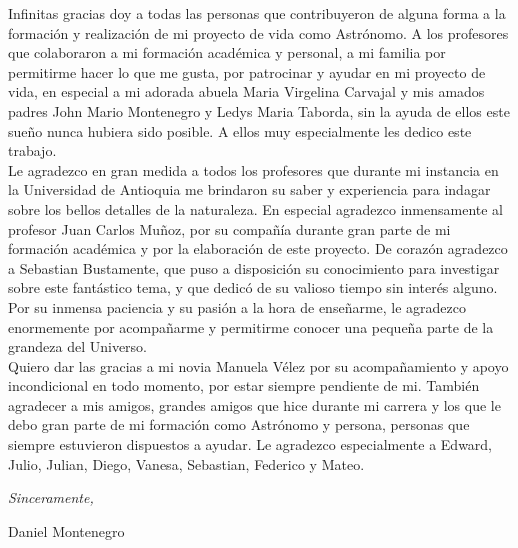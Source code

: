 \begin{acknowledgements}      

Infinitas gracias doy a todas las personas que contribuyeron de alguna forma a la formación y realización de mi proyecto de vida como Astrónomo. A los profesores que colaboraron a mi formación académica y personal, a mi familia por permitirme hacer lo que me gusta, por patrocinar y ayudar en mi proyecto de vida, en especial a mi adorada abuela Maria Virgelina Carvajal y mis amados padres  John Mario Montenegro y Ledys Maria Taborda, sin la ayuda de ellos este sueño nunca hubiera sido posible. A ellos muy especialmente les dedico este trabajo. \\

Le agradezco en gran medida a todos los profesores que durante mi instancia en la Universidad de Antioquia me brindaron su saber y experiencia para indagar sobre los bellos detalles de la naturaleza. En especial agradezco inmensamente al profesor Juan Carlos Mu\~noz, por su compañía durante gran parte de mi formación académica y por la elaboración de este proyecto. De corazón agradezco a Sebastian Bustamente, que puso a disposición su conocimiento para investigar sobre este fantástico tema, y que dedicó de su valioso tiempo sin interés alguno. Por su inmensa paciencia y su pasión a la hora de enseñarme, le agradezco enormemente por acompañarme y permitirme conocer una pequeña parte de la grandeza del Universo. \\

Quiero dar las gracias a mi novia Manuela Vélez por su acompañamiento y apoyo incondicional en todo momento, por estar siempre pendiente de mi. También agradecer a mis amigos, grandes amigos que hice durante mi carrera y los que le debo gran parte de mi formación como Astrónomo y persona, personas que siempre estuvieron dispuestos a ayudar. Le agradezco especialmente a Edward, Julio, Julian, Diego, Vanesa, Sebastian, Federico y Mateo. 
 


\begin{flushright}
\textit{Sinceramente,}


Daniel Montenegro


\monthname \ \the\year
\end{flushright}


\end{acknowledgements}

